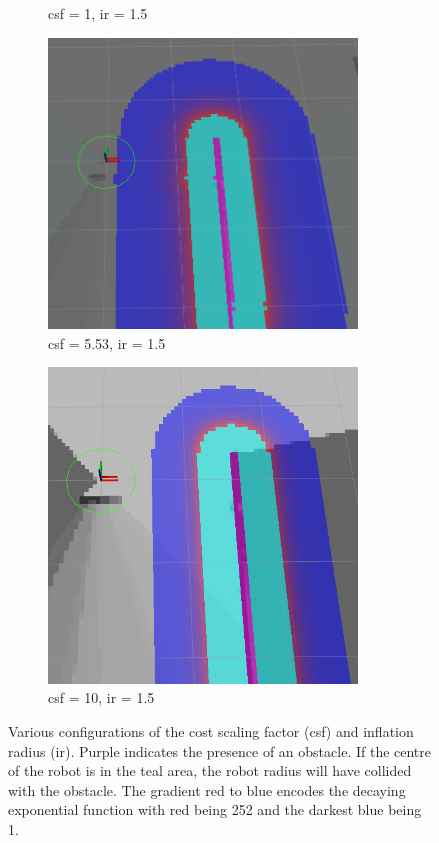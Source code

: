 \documentclass[capstone_report.tex]{subfiles}
\begin{document}
\begin{figure}[H]
\begin{subfigure}{0.33\textwidth}
        \caption{csf = 1, ir = 1.5}
    \end{subfigure}%
    \begin{subfigure}{0.33\textwidth}
        \centering
        \includegraphics[width=0.9\textwidth]{imgs/lcm/lcm_csf_553_ir_15.png}
        \caption{csf = 5.53, ir = 1.5}
    \end{subfigure}
    \begin{subfigure}{0.33\textwidth}
        \centering
        \includegraphics[width=0.9\textwidth]{imgs/lcm/lcm_csf_10_ir_15.png}
        \caption{csf = 10, ir = 1.5}
    \end{subfigure}
    \caption{Various configurations of the cost scaling factor (csf) and inflation radius (ir).  Purple indicates the presence of an obstacle.  If the centre of the robot is in the teal area, the robot radius will have collided with the obstacle.  The gradient red to blue encodes the decaying exponential function with red being 252 and the darkest blue being 1.}\label{fig:costmap_config}
\end{figure}
\end{document}
